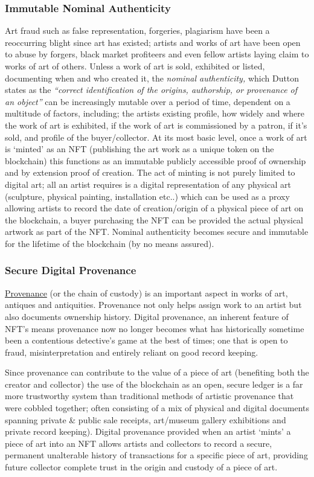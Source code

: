 \subsubsection{Immutable Nominal Authenticity} 
Art fraud such as false
  representation, forgeries, plagiarism have been a reoccurring blight
  since art has existed; artists and works of art have been open to
  abuse by forgers, black market profiteers and even fellow artists
  laying claim to works of art of others. Unless a work of art is sold,
  exhibited or listed, documenting when and who created it, the
  \emph{nominal authenticity,} which Dutton states as the
  \emph{``correct identification of the origins, authorship, or
  provenance of an object''} \cite{dutton2003authenticity} can be increasingly mutable over a period
  of time, dependent on a multitude of factors, including; the artists
  existing profile, how widely and where the work of art is exhibited,
  if the work of art is commissioned by a patron, if it's sold, and
  profile of the buyer/collector. At its most basic level, once a work
  of art is `minted' as an NFT (publishing the art work as a unique
  token on the blockchain) this functions as an immutable publicly
  accessible proof of ownership and by extension proof of creation. The
  act of minting is not purely limited to digital art; all an artist
  requires is a digital representation of any physical art (sculpture,
  physical painting, installation etc..) which can be used as a proxy
  allowing artists to record the date of creation/origin of a physical
  piece of art on the blockchain, a buyer purchasing the NFT can be
  provided the actual physical artwork as part of the NFT. Nominal
  authenticity becomes secure and immutable for the lifetime of the blockchain (by no means assured).

\subsubsection{Secure Digital Provenance}
\href{https://en.wikipedia.org/wiki/Provenance}{Provenance} (or the chain of custody) is an important aspect in works of art, antiques and antiquities. Provenance not only helps assign work to an artist but also documents ownership history. Digital provenance, an inherent feature of NFT's means provenance now no longer becomes what has historically sometime been a contentious detective's game at the best of times; one that is open to fraud, misinterpretation and entirely reliant on good record keeping.\par
Since provenance can contribute to the value of a piece of art (benefiting both the creator and collector) the use of the blockchain as an open, secure ledger is a far more trustworthy system than traditional methods of artistic provenance that were cobbled together; often
consisting of a mix of physical and digital documents spanning private
\& public sale receipts, art/museum gallery exhibitions and private
record keeping). Digital provenance provided when an artist `mints' a
piece of art into an NFT allows artists and collectors to record a
secure, permanent unalterable history of transactions for a specific
piece of art, providing future collector complete trust in the origin
and custody of a piece of art.

